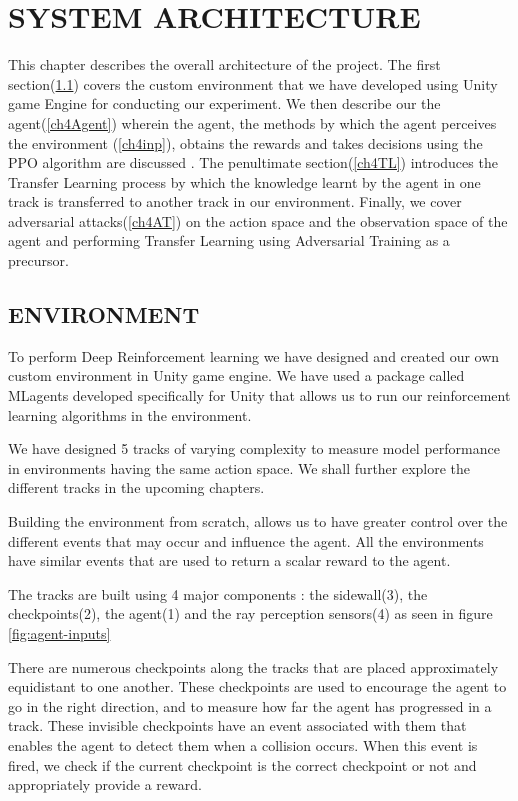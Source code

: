
\chapter{SYSTEM ARCHITECTURE} \label{ch4}
This chapter describes the overall architecture of the project. The first section(\ref{ch4Env}) covers the custom environment that we have developed using Unity game Engine for conducting our experiment. We then describe our the agent(\ref{ch4Agent}) wherein the agent, the methods by which the agent perceives the environment (\ref{ch4inp}), obtains the rewards and takes decisions using the PPO algorithm are discussed . The penultimate section(\ref{ch4TL}) introduces the Transfer Learning process by which the knowledge learnt by the agent in one track is transferred to another track in our environment. Finally, we cover adversarial attacks(\ref{ch4AT}) on the action space and the observation space of the agent and performing Transfer Learning using Adversarial Training as a precursor.

\section{ENVIRONMENT} \label{ch4Env}



To perform Deep Reinforcement learning we have designed and created our own custom environment in Unity game engine. We have used a package called MLagents developed specifically for Unity that allows us to run our reinforcement learning algorithms in the environment.

We have designed 5 tracks of varying complexity to measure model performance in environments having the same action space. We shall further explore the different tracks in the upcoming chapters. 

Building the environment from scratch, allows us to have greater control over the different events that may occur and influence the agent. All the environments have similar events that are used to return a scalar reward to the agent.



The tracks are built using 4 major components : the sidewall(3), the checkpoints(2), the agent(1) and the ray perception sensors(4) as seen in figure \ref{fig:agent-inputs}

There are numerous checkpoints along the tracks that are placed approximately equidistant to one another. These checkpoints are used to encourage the agent to go in the right direction, and to measure how far the agent has progressed in a track. These invisible checkpoints have an event associated with them that enables the agent to detect them when a collision occurs. When this event is fired, we check if the current checkpoint is the correct checkpoint or not and appropriately provide a reward.

